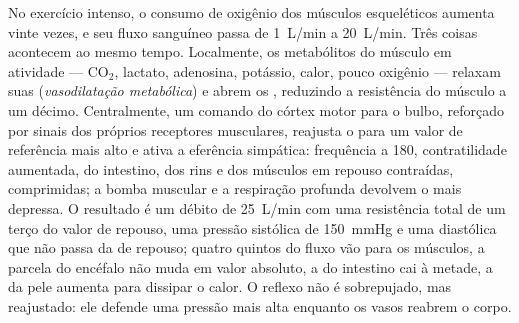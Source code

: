 \begin{proposition}[O exercício]\label{prop:b2:blood-pressure:exercise}
No exercício intenso, o consumo de oxigênio dos músculos esqueléticos
aumenta vinte vezes, e seu fluxo sanguíneo passa de \qty{1}{L/min} a
\qty{20}{L/min}. Três coisas acontecem ao mesmo tempo. Localmente, os
metabólitos do músculo em atividade --- $\mathrm{CO_2}$, lactato,
adenosina, potássio, calor, pouco oxigênio --- relaxam suas 
(\emph{vasodilatação metabólica}) e abrem os , reduzindo a
resistência do músculo a um décimo. Centralmente, um comando do córtex
motor para o bulbo, reforçado por sinais dos próprios receptores
musculares, reajusta o  para um valor de referência mais
alto e ativa a eferência simpática: frequência a 180, contratilidade
aumentada,  do intestino, dos rins e dos músculos em repouso
contraídas,  comprimidas; a bomba muscular e a respiração profunda
devolvem o  mais depressa. O resultado é um débito de
\qty{25}{L/min} com uma resistência total de um terço do valor de
repouso, uma pressão sistólica de \qty{150}{mmHg} e uma diastólica que
não passa da de repouso; quatro quintos do fluxo vão para os músculos,
a parcela do encéfalo não muda em valor absoluto, a do intestino cai à
metade, a da pele aumenta para dissipar o calor. O reflexo não é
sobrepujado, mas reajustado: ele defende uma pressão mais alta enquanto
os vasos reabrem o corpo.
\end{proposition}

